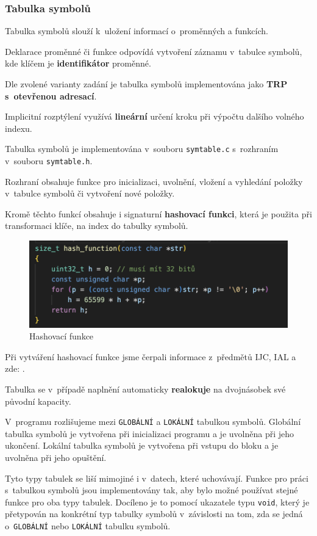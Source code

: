 \documentclass[a4paper, 11pt]{article}
\begin{document}
	\subsubsection{Tabulka symbolů}
	Tabulka symbolů slouží k~uložení informací o~proměnných a funkcích.
	\par\noindent Deklarace proměnné či funkce odpovídá vytvoření záznamu v~tabulce symbolů, kde klíčem je \textbf{identifikátor} proměnné.
	\par\noindent Dle zvolené varianty zadání je tabulka symbolů implementována jako \textbf{TRP s~otevřenou adresací}.
	\par\noindent Implicitní rozptýlení využívá \textbf{lineární} určení kroku při výpočtu dalšího volného indexu. 
	\par\noindent Tabulka symbolů je implementována v~souboru \texttt{symtable.c} s~rozhraním v~souboru \texttt{symtable.h}.
	\par\noindent Rozhraní obsahuje funkce pro inicializaci, uvolnění, vložení a vyhledání položky v~tabulce symbolů či vytvoření nové položky.
	\par\noindent Kromě těchto funkcí obsahuje i signaturní \textbf{hashovací funkci}, která je použita při transformaci klíče, na index do tabulky symbolů.
	\begin{figure}[h]
		\centering
		\includegraphics[width=0.5\linewidth]{include/hash_function.png}
		\caption{Hashovací funkce}
		\label{fig:hash_function}
	\end{figure}

	\par\noindent Při vytváření hashovací funkce jsme čerpali informace z~předmětů IJC, IAL a zde: \cite{HASH_FUNC}.


	\par\noindent Tabulka se v~případě naplnění automaticky \textbf{realokuje} na dvojnásobek své původní kapacity.
	\par\noindent V~programu rozlišujeme mezi \texttt{GLOBÁLNÍ} a \texttt{LOKÁLNÍ} tabulkou symbolů. Globální tabulka symbolů je vytvořena při inicializaci programu a je uvolněna při jeho ukončení. Lokální tabulka symbolů je vytvořena při vstupu do bloku a je uvolněna při jeho opuštění.
	\par\noindent Tyto typy tabulek se liší mimojiné i v~datech, které uchovávají. Funkce pro práci s~tabulkou symbolů jsou implementovány tak, aby bylo možné používat stejné funkce pro oba typy tabulek. Docíleno je to pomocí ukazatele typu \texttt{void}, který je přetypován na konkrétní typ tabulky symbolů v~závislosti na tom, zda se jedná o~\texttt{GLOBÁLNÍ} nebo \texttt{LOKÁLNÍ} tabulku symbolů.
	
\end{document}
